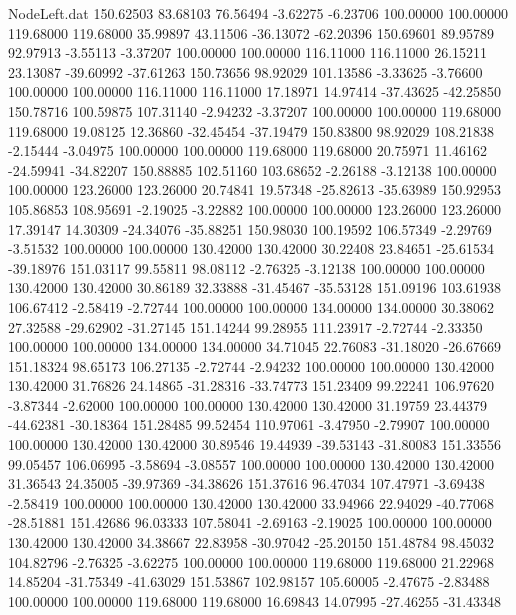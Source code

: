 \begin{filecontents}{NodeLeft.dat}
 150.62503   83.68103   76.56494    -3.62275   -6.23706  100.00000  100.00000  119.68000  119.68000   35.99897   43.11506  -36.13072  -62.20396
 150.69601   89.95789   92.97913    -3.55113   -3.37207  100.00000  100.00000  116.11000  116.11000   26.15211   23.13087  -39.60992  -37.61263
 150.73656   98.92029  101.13586    -3.33625   -3.76600  100.00000  100.00000  116.11000  116.11000   17.18971   14.97414  -37.43625  -42.25850
 150.78716  100.59875  107.31140    -2.94232   -3.37207  100.00000  100.00000  119.68000  119.68000   19.08125   12.36860  -32.45454  -37.19479
 150.83800   98.92029  108.21838    -2.15444   -3.04975  100.00000  100.00000  119.68000  119.68000   20.75971   11.46162  -24.59941  -34.82207
 150.88885  102.51160  103.68652    -2.26188   -3.12138  100.00000  100.00000  123.26000  123.26000   20.74841   19.57348  -25.82613  -35.63989
 150.92953  105.86853  108.95691    -2.19025   -3.22882  100.00000  100.00000  123.26000  123.26000   17.39147   14.30309  -24.34076  -35.88251
 150.98030  100.19592  106.57349    -2.29769   -3.51532  100.00000  100.00000  130.42000  130.42000   30.22408   23.84651  -25.61534  -39.18976
 151.03117   99.55811   98.08112    -2.76325   -3.12138  100.00000  100.00000  130.42000  130.42000   30.86189   32.33888  -31.45467  -35.53128
 151.09196  103.61938  106.67412    -2.58419   -2.72744  100.00000  100.00000  134.00000  134.00000   30.38062   27.32588  -29.62902  -31.27145
 151.14244   99.28955  111.23917    -2.72744   -2.33350  100.00000  100.00000  134.00000  134.00000   34.71045   22.76083  -31.18020  -26.67669
 151.18324   98.65173  106.27135    -2.72744   -2.94232  100.00000  100.00000  130.42000  130.42000   31.76826   24.14865  -31.28316  -33.74773
 151.23409   99.22241  106.97620    -3.87344   -2.62000  100.00000  100.00000  130.42000  130.42000   31.19759   23.44379  -44.62381  -30.18364
 151.28485   99.52454  110.97061    -3.47950   -2.79907  100.00000  100.00000  130.42000  130.42000   30.89546   19.44939  -39.53143  -31.80083
 151.33556   99.05457  106.06995    -3.58694   -3.08557  100.00000  100.00000  130.42000  130.42000   31.36543   24.35005  -39.97369  -34.38626
 151.37616   96.47034  107.47971    -3.69438   -2.58419  100.00000  100.00000  130.42000  130.42000   33.94966   22.94029  -40.77068  -28.51881
 151.42686   96.03333  107.58041    -2.69163   -2.19025  100.00000  100.00000  130.42000  130.42000   34.38667   22.83958  -30.97042  -25.20150
 151.48784   98.45032  104.82796    -2.76325   -3.62275  100.00000  100.00000  119.68000  119.68000   21.22968   14.85204  -31.75349  -41.63029
 151.53867  102.98157  105.60005    -2.47675   -2.83488  100.00000  100.00000  119.68000  119.68000   16.69843   14.07995  -27.46255  -31.43348

\end{filecontents}
